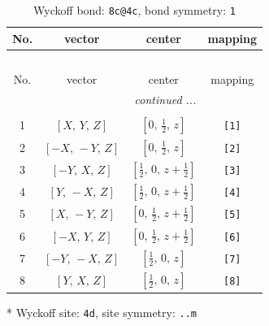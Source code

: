 \documentclass[fleqn,8pt]{jsarticle}
\begin{document}
\renewcommand{\arraystretch}{1.2}
\begin{longtable}{cccc}
\caption{Wyckoff bond: {\tt 8c@4c}, bond symmetry: {\tt 1}}
 \\
 \hline \hline
No. & vector & center & mapping \\ \hline \endfirsthead

\multicolumn{3}{l}{\tablename\ \thetable{}} \\
 \hline \hline
No. & vector & center & mapping \\ \hline \endhead

 \hline \hline
\multicolumn{3}{r}{\footnotesize\it continued ...} \\ \endfoot

 \hline \hline
\multicolumn{3}{r}{} \\ \endlastfoot

1 & $\left[ X,\, Y,\, Z \right]$ & $\left[ 0,\, \frac{1}{2},\, z \right]$ & {\tt [1]} \\ \hline
2 & $\left[ - X,\, - Y,\, Z \right]$ & $\left[ 0,\, \frac{1}{2},\, z \right]$ & {\tt [2]} \\ \hline
3 & $\left[ - Y,\, X,\, Z \right]$ & $\left[ \frac{1}{2},\, 0,\, z + \frac{1}{2} \right]$ & {\tt [3]} \\ \hline
4 & $\left[ Y,\, - X,\, Z \right]$ & $\left[ \frac{1}{2},\, 0,\, z + \frac{1}{2} \right]$ & {\tt [4]} \\ \hline
5 & $\left[ X,\, - Y,\, Z \right]$ & $\left[ 0,\, \frac{1}{2},\, z + \frac{1}{2} \right]$ & {\tt [5]} \\ \hline
6 & $\left[ - X,\, Y,\, Z \right]$ & $\left[ 0,\, \frac{1}{2},\, z + \frac{1}{2} \right]$ & {\tt [6]} \\ \hline
7 & $\left[ - Y,\, - X,\, Z \right]$ & $\left[ \frac{1}{2},\, 0,\, z \right]$ & {\tt [7]} \\ \hline
8 & $\left[ Y,\, X,\, Z \right]$ & $\left[ \frac{1}{2},\, 0,\, z \right]$ & {\tt [8]} \\
\end{longtable}
* Wyckoff site: {\tt 4d}, site symmetry: {\tt ..m}
\renewcommand{\arraystretch}{1.2}
\end{document}
